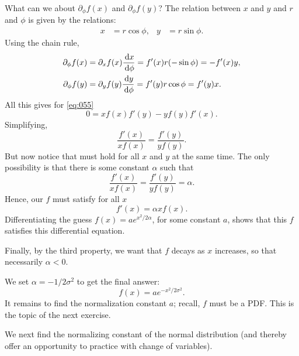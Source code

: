 \documentclass[lectures]{subfiles}
\begin{document}
\begin{exercise}
\begin{solution}
What can we about $\partial_{\phi} f(x)$ and $\partial_{\phi}f(y)$?
The relation between $x$ and $y$ and $r$ and $\phi$ is given by the relations:
\begin{align}
\label{eq:056}
x &= r \cos \phi, & y&=r\sin \phi.
\end{align}
Using the chain rule,
\begin{align}
  \label{eq:057}
  \partial_{\phi} f(x) &= \partial_{x} f(x) \frac{\,\textrm{d}x}{\,\textrm{d}\phi} = f'(x) r (-\sin \phi) = - f'(x) y, \\
  \partial_{\phi} f(y) &= \partial_{y} f(y) \frac{\,\textrm{d}y}{\,\textrm{d}\phi} = f'(y) r \cos \phi =  f'(y) x.
\end{align}
All this gives for \cref{eq:055}
\begin{equation}
\label{eq:058}
0 = x f(x) f'(y) - y f(y)f'(x).
\end{equation}
Simplifying,
\begin{equation}
  \label{eq:059}
   \frac{f'(x)}{x f(x)} = \frac{f'(y)}{ y f(y)}.
\end{equation}
But now notice that must hold for all $x$ and $y$ at the same time. The only possibility is that there is some constant $\alpha$ such that
\begin{equation}
\label{eq:0510}
   \frac{f'(x)}{x f(x)} =  \frac{f'(y)}{y f(y)} = \alpha.
\end{equation}
Hence, our $f$ must satisfy for all $x$
\begin{equation}
\label{eq:0511}
f'(x) = \alpha x f(x).
\end{equation}
Differentiating the guess $f(x) = a e^{ x^2/{2 \alpha}}$, for some constant $a$, shows that this $f$ satisfies this differential equation.

Finally, by the third property, we want that $f$ decays as $x$ increases, so that necessarily $\alpha<0$.


We set $\alpha = -1/2\sigma^{2}$ to get the final answer:
\begin{equation}
  \label{eq:0512}
  f(x) = a e^{-x^{2}/2 \sigma^{2}}.
\end{equation}
It remains to find the normalization constant $a$; recall, $f$ must be a PDF. This is the topic of the next exercise.
\end{solution}
\end{exercise}

We next find the normalizing constant of the normal distribution (and thereby offer an opportunity to practice with change of variables).
\end{document}
